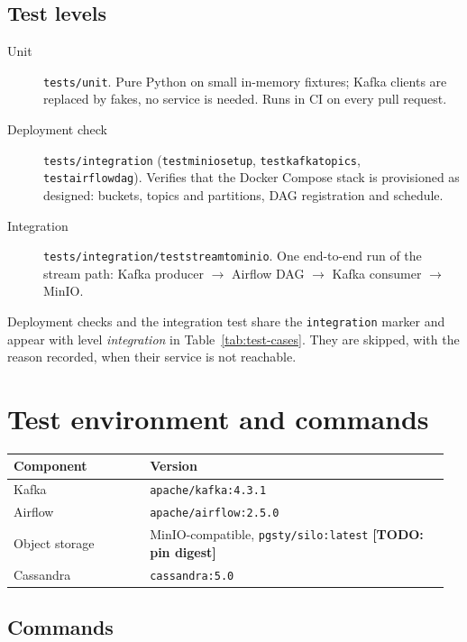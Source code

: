 \documentclass[11pt,a4paper]{article}
\newcommand{\todo}[1]{\textbf{[TODO: #1]}}
\newcommand{\code}[1]{\texttt{#1}}
\renewcommand{\_}{\plainunderscore\allowbreak}
\begin{document}
\subsection{Test levels}

\begin{description}
\item[Unit] \code{tests/unit}. Pure Python on small in-memory fixtures; Kafka clients are
replaced by fakes, no service is needed. Runs in CI on every pull request.
\item[Deployment check] \code{tests/integration} (\code{test\_minio\_setup},
\code{test\_kafka\_topics}, \code{test\_airflow\_dag}). Verifies that the Docker Compose
stack is provisioned as designed: buckets, topics and partitions, DAG registration and
schedule.
\item[Integration] \code{tests/integration/test\_stream\_to\_minio}. One end-to-end run of
the stream path: Kafka producer $\rightarrow$ Airflow DAG $\rightarrow$ Kafka consumer $\rightarrow$ MinIO.
\end{description}

Deployment checks and the integration test share the \code{integration} marker and
appear with level \emph{integration} in Table~\ref{tab:test-cases}. They are skipped,
with the reason recorded, when their service is not reachable.

\section{Test environment and commands}

\begin{tabular}{@{}p{0.30\linewidth}p{0.66\linewidth}@{}}
\toprule
\textbf{Component} & \textbf{Version} \\
\midrule
Kafka & \code{apache/kafka:4.3.1} \\
Airflow & \code{apache/airflow:2.5.0} \\
Object storage & MinIO-compatible, \code{pgsty/silo:latest} \todo{pin digest} \\
Cassandra & \code{cassandra:5.0} \\
\bottomrule
\end{tabular}

\subsection{Commands}
\end{document}
